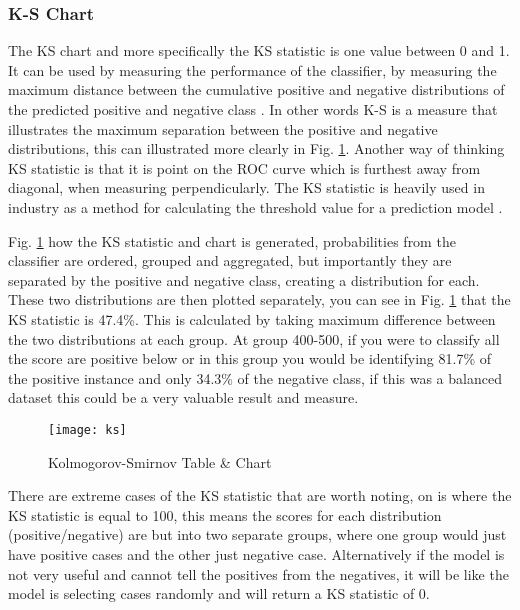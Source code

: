 \subsubsection{K-S Chart}\label{subsub:ks}
The KS chart and more specifically the KS statistic is one value between 0 and 1. It can be used by measuring the performance of the classifier, by measuring the maximum distance between the cumulative positive and negative distributions of the predicted positive and negative class \citep{seliya_study_2009}. In other words K-S is a measure that illustrates the maximum separation between the positive and negative distributions, this can illustrated more clearly in Fig. \ref{fig:ks}. Another way of thinking KS statistic is that it is point on the ROC curve which is furthest away from diagonal, when measuring perpendicularly. The KS statistic is heavily used in industry as a method for calculating the threshold value for a prediction model \citep{hand_good_2005}. 

Fig. \ref{fig:ks} how the KS statistic and chart is generated, probabilities from the classifier are ordered, grouped and aggregated, but importantly they are separated by the positive and negative class, creating a distribution for each. These two distributions are then plotted separately, you can see in Fig. \ref{fig:ks} that the KS statistic is 47.4\%. This is calculated by taking maximum difference between the two distributions at each group. At group 400-500, if you were to classify all the score are positive below or in this group you would be identifying 81.7\% of the positive instance and only 34.3\% of the negative class, if this was a balanced dataset this could be a very valuable result and measure. 

\begin{figure}[H]
	\texttt{[image: ks]}
	\caption[Kolmogorov-Smirnov chart ]
	{Kolmogorov-Smirnov Table \& Chart }
	\label{fig:ks}
\end{figure}

There are extreme cases of the KS statistic that are worth noting, on is where the KS statistic is equal to 100, this means the scores for each distribution (positive/negative) are but into two separate groups, where one group would just have positive cases and the other just negative case. Alternatively if the model is not very useful and cannot tell the positives from the negatives, it will be like the model is selecting cases randomly and will return a KS statistic of 0.
 

